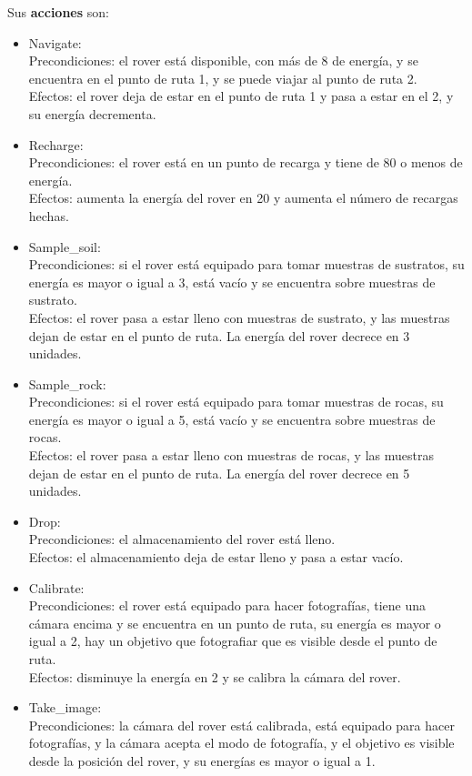 \documentclass{uc3mpracticas}
\begin{document}
  Sus \textbf{acciones} son:
  \begin{itemize}
    \item Navigate:
    \\Precondiciones: el rover está disponible, con más de 8 de energía, y se encuentra en el punto de ruta 1, y se puede viajar al punto de ruta 2.
    \\Efectos: el rover deja de estar en el punto de ruta 1 y pasa a estar en el 2, y su energía decrementa.
    \item Recharge:
    \\Precondiciones: el rover está en un punto de recarga y tiene de 80 o menos de energía.
    \\Efectos: aumenta la energía del rover en 20 y aumenta el número de recargas hechas.
    \item Sample\_soil:
    \\Precondiciones: si el rover está equipado para tomar muestras de sustratos, su energía es mayor o igual a 3, está vacío y se encuentra sobre muestras de sustrato.
    \\Efectos: el rover pasa a estar lleno con muestras de sustrato, y las muestras dejan de estar en el punto de ruta. La energía del rover decrece en 3 unidades.
    \item Sample\_rock:
    \\Precondiciones: si el rover está equipado para tomar muestras de rocas, su energía es mayor o igual a 5, está vacío y se encuentra sobre muestras de rocas.
    \\Efectos: el rover pasa a estar lleno con muestras de rocas, y las muestras dejan de estar en el punto de ruta. La energía del rover decrece en 5 unidades.
    \item Drop:
    \\Precondiciones: el almacenamiento del rover está lleno.
    \\Efectos: el almacenamiento deja de estar lleno y pasa a estar vacío.
    \item Calibrate:
    \\Precondiciones: el rover está equipado para hacer fotografías, tiene una cámara encima y se encuentra en un punto de ruta, su energía es mayor o igual a 2, hay un objetivo que fotografiar que es visible desde el punto de ruta.
    \\Efectos: disminuye la energía en 2 y se calibra la cámara del rover.
    \item Take\_image:
    \\Precondiciones: la cámara del rover está calibrada, está equipado para hacer fotografías, y la cámara acepta el modo de fotografía, y el objetivo es visible desde la posición del rover, y su energías es mayor o igual a 1.

\end{itemize}
\end{document}
